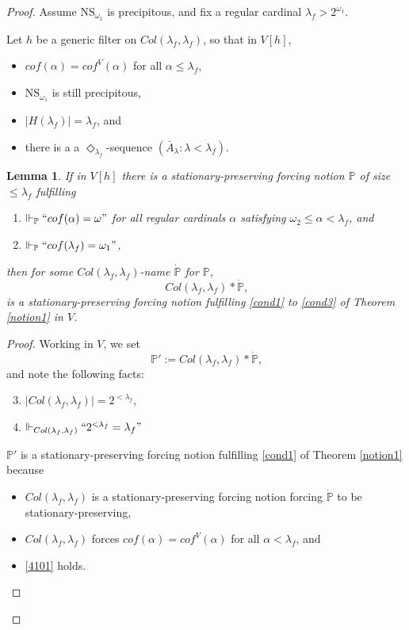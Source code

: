 \documentclass[12pt, twoside]{memoir}
\numberwithin{equation}{section}
\newtheorem{lem}[thm]{Lemma}
\theoremstyle{definition}
\theoremstyle{remark}
\theoremstyle{definition}
\theoremstyle{definition}
\theoremstyle{definition}
\theoremstyle{remark}
\begin{document}
\begin{proof}
Assume $\mathrm{NS}_{\omega_1}$ is precipitous, and fix a regular cardinal $\lambda_f > 2^{\omega_1}$.  

Let $h$ be a generic filter on $Col(\lambda_f, \lambda_f)$, so that in $V[h]$, 
\begin{itemize}
    \item $cof(\alpha) = cof^{V}(\alpha)$ for all $ \alpha \leq \lambda_f$,
    \item $\mathrm{NS}_{\omega_1}$ is still precipitous,
    \item $|H(\lambda_f)| = \lambda_f$, and
    \item there is a a $\Diamond_{\lambda_f}$-sequence $(\bar{A}_{\lambda} : \lambda < \lambda_f)$.
\end{itemize}

\begin{lem}\label{lem26}
If in $V[h]$ there is a stationary-preserving forcing notion $\mathbb{P}$ of size $\leq \lambda_f$ fulfilling 
\begin{enumerate}[label=(\arabic*')]
    \item\label{4101} $\Vdash_{\mathbb{P}} ``cof(\alpha) = \omega"$ for all regular cardinals $\alpha$ satisfying $\omega_2 \leq \alpha < \lambda_f$, and
    \item\label{4102} $\Vdash_{\mathbb{P}} ``cof(\lambda_f) = \omega_1"$,
\end{enumerate}
then for some $Col(\lambda_f, \lambda_f)$-name $\dot{\mathbb{P}}$ for $\mathbb{P}$,
\begin{equation*}
    Col(\lambda_f, \lambda_f) * \dot{\mathbb{P}} \text{,}
\end{equation*} 
is a stationary-preserving forcing notion fulfilling \ref{cond1} to \ref{cond3} of Theorem \ref{notion1} in $V$.
\end{lem}

\begin{proof}
Working in $V$, we set $$\mathbb{P}' := Col(\lambda_f, \lambda_f) * \dot{\mathbb{P}} \text{,}$$ and note the following facts:
\begin{enumerate}[label=(\arabic*')]
    \setcounter{enumi}{2}
    \item\label{4103} $|Col(\lambda_f, \lambda_f)| = 2^{< \lambda_f}$,
    \item\label{4104} $\Vdash_{Col(\lambda_f, \lambda_f)} ``2^{< \lambda_f} = \lambda_f"$
\end{enumerate}
$\mathbb{P}'$ is a stationary-preserving forcing notion fulfilling \ref{cond1} of Theorem \ref{notion1} because 
\begin{itemize}
    \item $Col(\lambda_f, \lambda_f)$ is a stationary-preserving forcing notion forcing $\dot{\mathbb{P}}$ to be stationary-preserving, 
    \item $Col(\lambda_f, \lambda_f)$ forces $cof(\alpha) = cof^{V}(\alpha)$ for all $ \alpha < \lambda_f$, and
    \item \ref{4101} holds.
\end{itemize}


\end{proof}
\end{proof}
\end{document}

